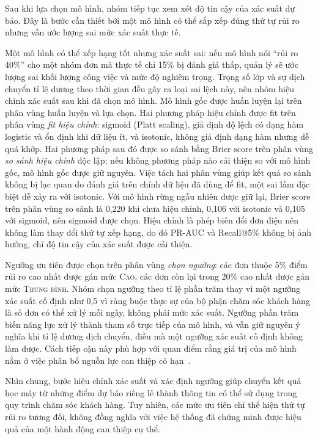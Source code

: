 \documentclass[12pt,a4paper]{report}
\begin{document}
Sau khi lựa chọn mô hình, nhóm tiếp tục xem xét độ tin cậy của xác suất dự báo. Đây là bước cần thiết bởi một mô hình có thể sắp xếp đúng thứ tự rủi ro nhưng vẫn ước lượng sai mức xác suất thực tế.

Một mô hình có thể xếp hạng tốt nhưng xác suất sai: nếu mô hình nói ``rủi ro 40\%'' cho một nhóm đơn mà thực tế chỉ 15\% bị đánh giá thấp, quản lý sẽ ước lượng sai khối lượng công việc và mức độ nghiêm trọng. Trọng số lớp và sự dịch chuyển tỉ lệ dương theo thời gian đều gây ra loại sai lệch này, nên nhóm hiệu chỉnh xác suất sau khi đã chọn mô hình. Mô hình gốc được huấn luyện lại trên phân vùng huấn luyện và lựa chọn. Hai phương pháp hiệu chỉnh được fit trên phân vùng \emph{fit hiệu chỉnh}: sigmoid (Platt scaling), giả định độ lệch có dạng hàm logistic và ổn định khi dữ liệu ít, và isotonic, không giả định dạng hàm nhưng dễ quá khớp. Hai phương pháp sau đó được so sánh bằng Brier score trên phân vùng \emph{so sánh hiệu chỉnh} độc lập; nếu không phương pháp nào cải thiện so với mô hình gốc, mô hình gốc được giữ nguyên. Việc tách hai phân vùng giúp kết quả so sánh không bị lạc quan do đánh giá trên chính dữ liệu đã dùng để fit, một sai lầm đặc biệt dễ xảy ra với isotonic. Với mô hình rừng ngẫu nhiên được giữ lại, Brier score trên phân vùng so sánh là 0,220 khi chưa hiệu chỉnh, 0,106 với isotonic và 0,105 với sigmoid, nên sigmoid được chọn. Hiệu chỉnh là phép biến đổi đơn điệu nên không làm thay đổi thứ tự xếp hạng, do đó PR-AUC và Recall@5\% không bị ảnh hưởng, chỉ độ tin cậy của xác suất được cải thiện.

Ngưỡng ưu tiên được chọn trên phân vùng \emph{chọn ngưỡng}: các đơn thuộc 5\% điểm rủi ro cao nhất được gán mức \textsc{Cao}, các đơn còn lại trong 20\% cao nhất được gán mức \textsc{Trung bình}. Nhóm chọn ngưỡng theo tỉ lệ phần trăm thay vì một ngưỡng xác suất cố định như 0,5 vì ràng buộc thực sự của bộ phận chăm sóc khách hàng là số đơn có thể xử lý mỗi ngày, không phải mức xác suất. Ngưỡng phần trăm biến năng lực xử lý thành tham số trực tiếp của mô hình, và vẫn giữ nguyên ý nghĩa khi tỉ lệ dương dịch chuyển, điều mà một ngưỡng xác suất cố định không làm được. Cách tiếp cận này phù hợp với quan điểm rằng giá trị của mô hình nằm ở việc phân bổ nguồn lực can thiệp có hạn~\cite{gomezvargas2025}.

Nhìn chung, bước hiệu chỉnh xác suất và xác định ngưỡng giúp chuyển kết quả học máy từ những điểm dự báo riêng lẻ thành thông tin có thể sử dụng trong quy trình chăm sóc khách hàng. Tuy nhiên, các mức ưu tiên chỉ thể hiện thứ tự rủi ro tương đối, không đồng nghĩa với việc hệ thống đã chứng minh được hiệu quả của một hành động can thiệp cụ thể.
\end{document}
